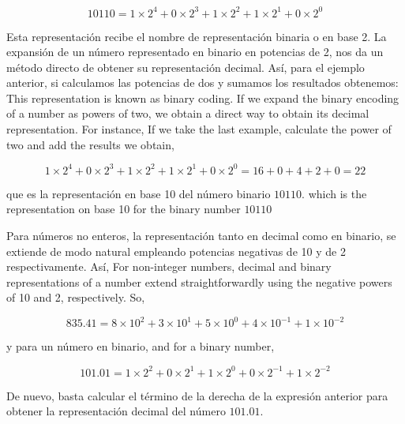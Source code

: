 \begin{equation*}
10110 = 1\times2^4+0\times2^3+1\times2^2+1\times2^1+0\times2^0 
\end{equation*}
\begin{paracol}{2}
Esta representación recibe el nombre de representación binaria o en base 2.
La expansión de un número representado en binario en potencias de 2, nos da un método directo de obtener su representación decimal. Así, para el ejemplo anterior, si calculamos las potencias de dos y sumamos los resultados obtenemos:
\switchcolumn
This representation is known as binary coding.  If we expand the binary encoding of a number as powers of two, we obtain a direct way to obtain its decimal representation. For instance, If we take the last example, calculate the power of two and add the results we obtain,
\end{paracol}
  \begin{equation*} 1\times2^4+0\times2^3+1\times2^2+1\times2^1+0\times2^0=16+0+4+2+0=22 
\end{equation*}
\begin{paracol}{2}
que es la representación en base 10 del número binario $10110$.
\switchcolumn
which is the representation on base 10 for the binary number $10110$
\end{paracol}
\begin{paracol}{2}
Para números no enteros, la representación tanto en decimal como en binario, se extiende de modo natural empleando potencias negativas de 10 y de 2 respectivamente. Así,
\switchcolumn
For non-integer numbers, decimal and binary representations of a number extend straightforwardly using the negative powers of 10 and 2, respectively. So,   
\end{paracol}
\begin{equation} \nonumber
835.41 = 8\times10^2+3\times10^1+5\times10^0+4\times10^{-1}+1\times10^{-2} 
\end{equation}
\begin{paracol}{2}
y para un número en binario,
\switchcolumn
and for a binary number,
\end{paracol}

\begin{equation} \nonumber
101.01 = 1\times2^2+0\times2^1+1\times2^0+0\times2^{-1}+1\times2^{-2} 
\end{equation}

De nuevo, basta calcular el término de la derecha de la expresión anterior para obtener la representación decimal del número $101.01$.

